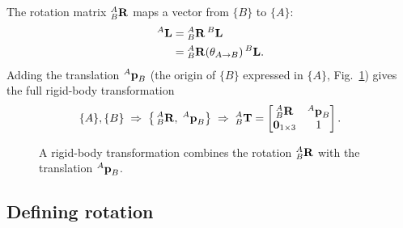 The rotation matrix ${}^{A}_{B}\boldsymbol{\mathbf{R}}$ maps a vector from $\{B\}$ to $\{A\}$:
\begin{align}
{}^{A}\boldsymbol{\mathbf{L}} &= {}^{A}_{B}\boldsymbol{\mathbf{R}}\,{}^{B}\boldsymbol{\mathbf{L}} \\
&= {}^{A}_{B}\boldsymbol{\mathbf{R}}(\theta_{A\to B})\,{}^{B}\boldsymbol{\mathbf{L}}.
\end{align}
Adding the translation ${}^{A}\boldsymbol{\mathbf{p}}_{B}$ (the origin of $\{B\}$ expressed in $\{A\}$, Fig.~\ref{fig:lec02-transl}) gives the full rigid-body transformation
\begin{align}
\{A\},\{B\} \;\Rightarrow\; \big\{\,{}^{A}_{B}\boldsymbol{\mathbf{R}},\;{}^{A}\boldsymbol{\mathbf{p}}_{B}\big\} \;\Rightarrow\;
{}^{A}_{B}\boldsymbol{\mathbf{T}} = \begin{bmatrix} {}^{A}_{B}\boldsymbol{\mathbf{R}} & {}^{A}\boldsymbol{\mathbf{p}}_{B} \\ \boldsymbol{\mathbf{0}}_{1\times3} & 1 \end{bmatrix}.
\end{align}

\begin{figure}[H]
\centering
{}
\caption{A rigid-body transformation combines the rotation ${}^{A}_{B}\boldsymbol{\mathbf{R}}$ with the translation ${}^{A}\boldsymbol{\mathbf{p}}_{B}$.}
\label{fig:lec02-transl}
\end{figure}

\subsection{Defining rotation}

